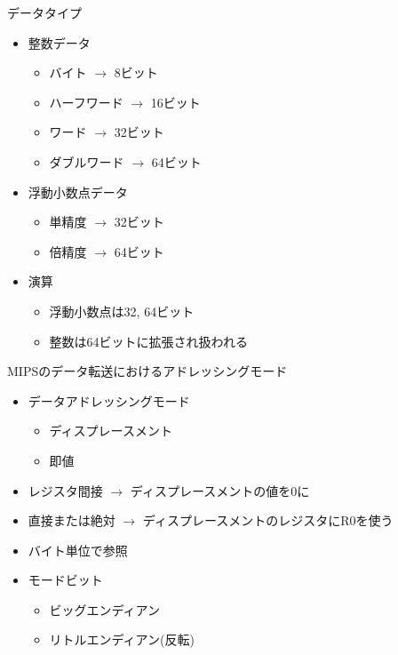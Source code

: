 \documentclass[dvipdfmx]{beamer}
\begin{document}
	\begin{frame}{データタイプ}
		\begin{itemize}
			\item 整数データ
				\begin{itemize}
					\item バイト $\to$ 8ビット
					\item ハーフワード $\to$ 16ビット
					\item ワード $\to$ 32ビット
					\item ダブルワード $\to$ 64ビット
				\end{itemize}
			\item 浮動小数点データ
				\begin{itemize}
					\item 単精度 $\to$ 32ビット
					\item 倍精度 $\to$ 64ビット
				\end{itemize}
			\item 演算
				\begin{itemize}
					\item 浮動小数点は32, 64ビット
					\item 整数は64ビットに拡張され扱われる
				\end{itemize}
		\end{itemize}
	\end{frame}

	\begin{frame}{MIPSのデータ転送におけるアドレッシングモード}
		\begin{itemize}
			\item データアドレッシングモード
				\begin{itemize}
					\item ディスプレースメント
					\item 即値
				\end{itemize}
			\item レジスタ間接 $\to$ ディスプレースメントの値を0に
			\item 直接または絶対 $\to$ ディスプレースメントのレジスタにR0を使う
			\item バイト単位で参照
			\item モードビット
				\begin{itemize}
					\item ビッグエンディアン
					\item リトルエンディアン(反転)
				\end{itemize}
		\end{itemize}
	\end{frame}
\end{document}
